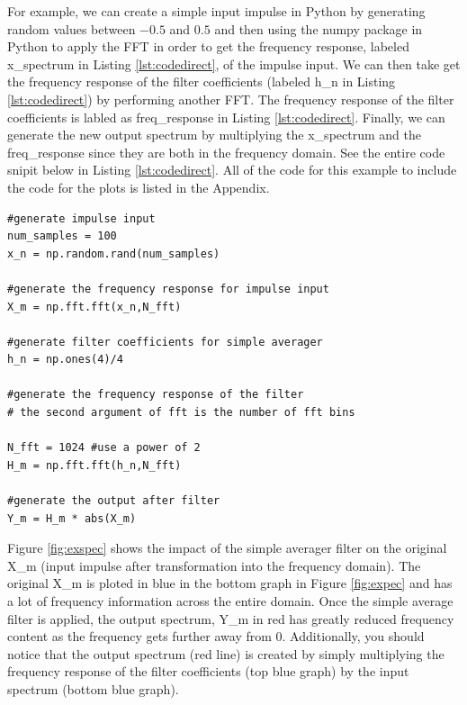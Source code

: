 For example, we can create a simple input impulse in Python by
generating random values between $-0.5$ and $0.5$ and then using
the numpy package in Python to apply the FFT in order to get the
frequency response, labeled x\_spectrum in Listing
\ref{lst:codedirect}, of the impulse input. We can then take get
the frequency response of the filter coefficients (labeled h\_n
in Listing \ref{lst:codedirect}) by performing another FFT. The
frequency response of the filter coefficients is labled as
freq\_response in Listing \ref{lst:codedirect}. Finally, we can
generate the new output spectrum by multiplying the x\_spectrum
and the freq\_response since they are both in the frequency
domain. See the entire code snipit below in Listing
\ref{lst:codedirect}. All of the code for this example to include
the code for the plots is listed in the Appendix.  

\lstset{language=Python}
\lstset{frame=lines}
\lstset{basicstyle=\footnotesize}
\begin{lstlisting}
#generate impulse input
num_samples = 100
x_n = np.random.rand(num_samples)

#generate the frequency response for impulse input
X_m = np.fft.fft(x_n,N_fft)

#generate filter coefficients for simple averager
h_n = np.ones(4)/4

#generate the frequency response of the filter
# the second argument of fft is the number of fft bins

N_fft = 1024 #use a power of 2
H_m = np.fft.fft(h_n,N_fft)

#generate the output after filter
Y_m = H_m * abs(X_m)
\end{lstlisting}

Figure \ref{fig:exspec} shows the impact of the simple averager
filter on the original X\_m (input impulse after transformation
into the frequency domain). The original X\_m is ploted in blue
in the bottom graph in Figure \ref{fig:expec} and has a lot of
frequency information across the entire domain. Once the simple
average filter is applied, the output spectrum, Y\_m in red has
greatly reduced frequency content as the frequency gets further
away from 0. Additionally, you should notice that the output
spectrum (red line) is created by simply multiplying the
frequency response of the filter coefficients (top blue graph) by
the input spectrum (bottom blue graph).  

